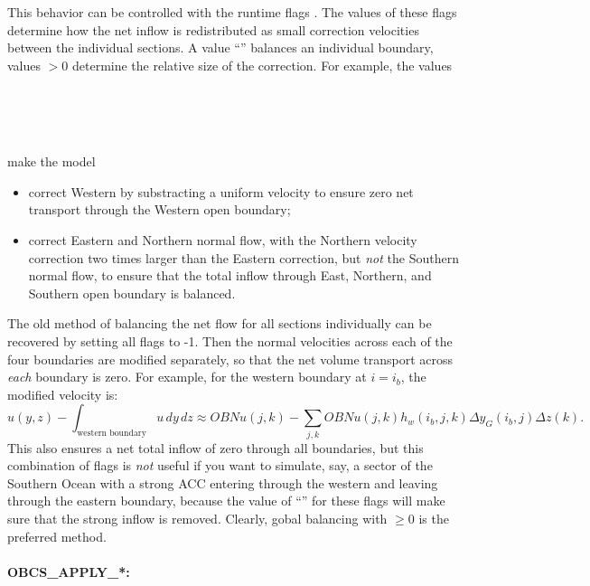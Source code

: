 This behavior can be controlled with the runtime flags
. The values of these flags determine
how the net inflow is redistributed as small correction velocities
between the individual sections. A value ``'' balances an
individual boundary, values $>0$ determine the relative size of the
correction. For example, the values
\begin{tabbing}
  \\
  \\
  \\
\end{tabbing}
make the model
\begin{itemize}
\item correct Western  by substracting a uniform velocity to
ensure zero net transport through the Western open boundary;
\item correct Eastern and Northern normal flow, with the Northern
  velocity correction two times larger than the Eastern correction, but
  \emph{not} the Southern normal flow, to ensure that the total inflow through
  East, Northern, and Southern open boundary is balanced.
\end{itemize}

The old method of balancing the net flow for all sections individually
can be recovered by setting all flags to -1. Then the normal
velocities across each of the four boundaries are modified separately,
so that the net volume transport across \emph{each} boundary is
zero. For example, for the western boundary at $i=i_{b}$, the modified
velocity is:
\[
u(y,z) - \int_{\mbox{western boundary}}u\,dy\,dz \approx OBNu(j,k) - \sum_{j,k}
OBNu(j,k) h_{w}(i_{b},j,k)\Delta{y_G(i_{b},j)}\Delta{z(k)}.
\]
This also ensures a net total inflow of zero through all boundaries,
but this combination of flags is \emph{not} useful if you want to
simulate, say, a sector of the Southern Ocean with a strong ACC
entering through the western and leaving through the eastern boundary,
because the value of ``'' for these flags will make sure that
the strong inflow is removed. Clearly, gobal balancing with
 $\ge0$ is the preferred method.

\paragraph{OBCS\_APPLY\_*:} ~ \\
~

